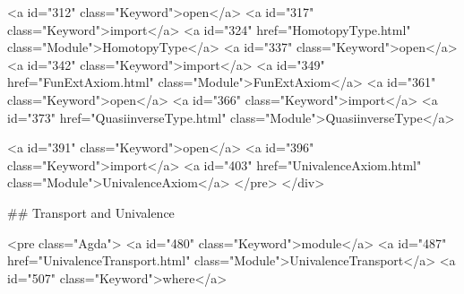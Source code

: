 <a id="312" class="Keyword">open</a> <a id="317" class="Keyword">import</a> <a id="324" href="HomotopyType.html" class="Module">HomotopyType</a>
<a id="337" class="Keyword">open</a> <a id="342" class="Keyword">import</a> <a id="349" href="FunExtAxiom.html" class="Module">FunExtAxiom</a>
<a id="361" class="Keyword">open</a> <a id="366" class="Keyword">import</a> <a id="373" href="QuasiinverseType.html" class="Module">QuasiinverseType</a>

<a id="391" class="Keyword">open</a> <a id="396" class="Keyword">import</a> <a id="403" href="UnivalenceAxiom.html" class="Module">UnivalenceAxiom</a>
</pre>
</div>

## Transport and Univalence

<pre class="Agda">
<a id="480" class="Keyword">module</a> <a id="487" href="UnivalenceTransport.html" class="Module">UnivalenceTransport</a> <a id="507" class="Keyword">where</a>

